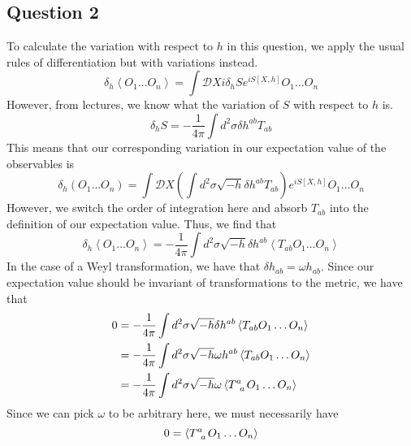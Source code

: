 \documentclass[11pt, oneside]{article}   	%
\theoremstyle{slanted}
\begin{document}
\subsection{Question 2}
To calculate the variation with respect to 
$ h $ in this question, we apply the usual rules 
of differentiation but with variations instead.
\[
 \delta _ h \left< O _ 1 \dots O _ n \right> 
 = \int \mathcal{ D } X i \delta _ h S e ^{ i S \left[  X, h  \right]  } O _ 1 \dots O _ n 
\]
However, from lectures, we know 
what the variation of $ S $ with respect to $ h $ is. 
\[
 \delta _ h S  = -\frac{1}{4 \pi } \int d ^ 2 \sigma 
 \delta h^{ ab  } T _{ ab }
\] This means that our 
corresponding variation in 
our expectation value of 
the observables is 
\[
 \delta _ h \left( O _ 1 
 \dots O _ n \right)   = \int \mathcal{ D } X \left( 
 \int d ^ 2 \sigma \sqrt{ - h  } \delta h ^{ ab } T _{ ab } \right)  e ^{ i S \left[  
 X,  h \right]  } O _ 1 \dots O _ n 
\] However, we switch 
the order of integration here 
and absorb $ T _{ ab} $ into 
the definition of our expectation value. Thus, we find 
that 
\[
	\delta _ h \left< O _1 \dots O _ n  \right> 
	= -\frac{1}{4 \pi } 
	\int d ^ 2 \sigma \sqrt{ -h } \delta h ^{ ab } 
	\left< T _{ ab } O _ 1 \dots O _ n  \right>
\] In the 
case of a Weyl transformation, we have 
that $ \delta h _{ ab }  = \omega h _{ ab } $. 
Since our expectation value 
should be invariant of transformations
to the metric, we have that 
\begin{align*}
	0 &=   -\frac{1}{4 \pi} \int d ^ 2 \sigma 
	\sqrt{ - h }  \delta h^{ ab } \left< T 
	_{ ab } O _ 1 \dots O _ n \right> \\
	&=  - \frac{1}{4 \pi } \int d ^ 2\sigma 
	\sqrt{ - h }  \omega h ^{ ab } \left< T _{ ab } O _ 1 
	\dots O _ n \right> \\ 
	&=   - \frac{1}{4 \pi } \int d ^ 2 \sigma 
	\sqrt{ - h }  \omega \left< T \indices{ ^ a _ a } 
	O _ 1 \dots O _ n \right>
\end{align*}
Since we can pick $ \omega $ to be arbitrary 
here, we must necessarily have 
\[
 0  = \left< T \indices{ ^ a _ a } O _ 1 \dots O _ n   \right>
\] 
\end{document}
